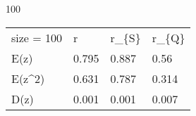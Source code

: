 
100
\begin{tabular}{llll}
\hline
 size = 100 & r     & r\_\{S\} & r\_\{Q\} \\
 E(z)       & 0.795 & 0.887 & 0.56  \\
 E(z\^{}2)     & 0.631 & 0.787 & 0.314 \\
 D(z)       & 0.001 & 0.001 & 0.007 \\
\hline
\end{tabular}